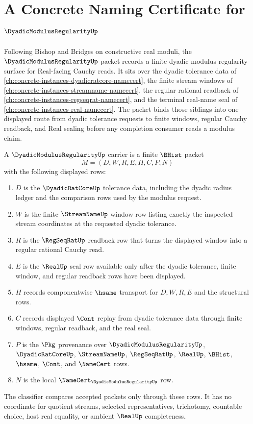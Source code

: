 \chapter{A Concrete Naming Certificate for $\DyadicModulusRegularityUp$}
\label{ch:concrete-instances-dyadic-modulus-regularity-namecert}

Following Bishop and Bridges on constructive real moduli, the $\DyadicModulusRegularityUp$ packet records a finite dyadic-modulus regularity surface for Real-facing Cauchy reads. It sits over the dyadic tolerance data of \autoref{ch:concrete-instances-dyadicratcore-namecert}, the finite stream windows of \autoref{ch:concrete-instances-streamname-namecert}, the regular rational readback of \autoref{ch:concrete-instances-regseqrat-namecert}, and the terminal real-name seal of \autoref{ch:concrete-instances-real-namecert}. The packet binds those siblings into one displayed route from dyadic tolerance requests to finite windows, regular Cauchy readback, and Real sealing before any completion consumer reads a modulus claim.

\begin{definition}
\label{def:dyadic-modulus-regularity-carrier}
A $\DyadicModulusRegularityUp$ carrier is a finite $\BHist$ packet
$$
M=(D,W,R,E,H,C,P,N)
$$
with the following displayed rows:
\begin{enumerate}
\item $D$ is the $\DyadicRatCoreUp$ tolerance data, including the dyadic radius ledger and the comparison rows used by the modulus request.
\item $W$ is the finite $\StreamNameUp$ window row listing exactly the inspected stream coordinates at the requested dyadic tolerance.
\item $R$ is the $\RegSeqRatUp$ readback row that turns the displayed window into a regular rational Cauchy read.
\item $E$ is the $\RealUp$ seal row available only after the dyadic tolerance, finite window, and regular readback rows have been displayed.
\item $H$ records componentwise $\hsame$ transport for $D,W,R,E$ and the structural rows.
\item $C$ records displayed $\Cont$ replay from dyadic tolerance data through finite windows, regular readback, and the real seal.
\item $P$ is the $\Pkg$ provenance over $\DyadicModulusRegularityUp$, $\DyadicRatCoreUp$, $\StreamNameUp$, $\RegSeqRatUp$, $\RealUp$, $\BHist$, $\hsame$, $\Cont$, and $\NameCert$ rows.
\item $N$ is the local $\NameCert_{\DyadicModulusRegularityUp}$ row.
\end{enumerate}
The classifier compares accepted packets only through these rows. It has no coordinate for quotient streams, selected representatives, trichotomy, countable choice, host real equality, or ambient $\RealUp$ completeness.
\end{definition}

